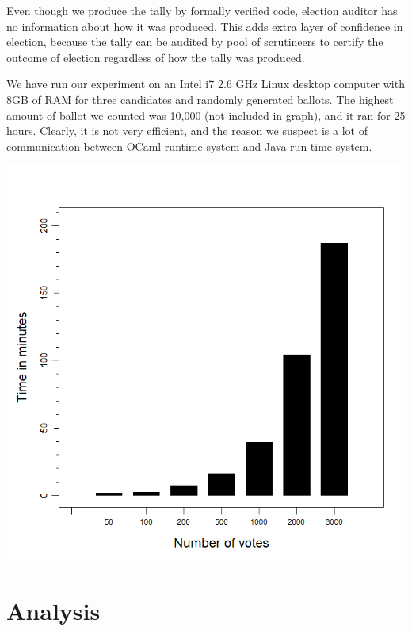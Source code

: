 \documentclass{llncs}
\begin{document}
Even though we produce the tally by formally verified code, election 
auditor has no information about how it was produced. This adds extra layer
of confidence in election, because the tally can be audited by pool
of scrutineers to certify the outcome of election regardless of how the tally 
was produced.

We have run our experiment on an  Intel  i7  2.6  GHz  Linux  desktop  computer
with  8GB  of  RAM for three candidates and randomly generated ballots. The 
highest amount of ballot we counted was 10,000 (not included in graph), and 
it ran for 25 hours. Clearly, it is not very efficient, and the reason we 
suspect is a lot of communication between OCaml runtime system 
and Java run time system.
\begin{center}
\includegraphics[scale=0.40]{PlotVer3.png}

\end{center}



\section{Analysis}
\end{document}
